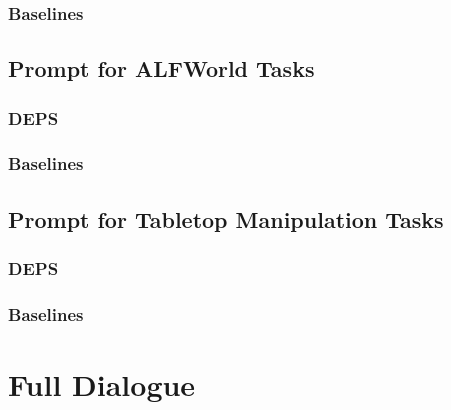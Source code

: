 \documentclass{article}
\begin{document}
\subsubsection{Baselines}











\subsection{Prompt for ALFWorld Tasks}\label{sec:alfworld_prompt}

\subsubsection{DEPS}





\subsubsection{Baselines}



\subsection{Prompt for Tabletop Manipulation Tasks}\label{sec:tabletop_prompt}

\subsubsection{DEPS}



\subsubsection{Baselines}



\section{Full Dialogue}\label{sec:interaction}



\end{document}
